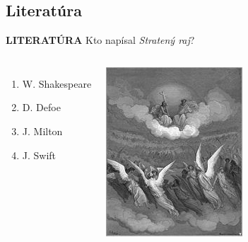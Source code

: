 \documentclass[dvipsnames]{beamer}
\begin{document}
\begin{frame}
	\subsection{Literatúra}
	\textbf{LITERATÚRA}
	\vskip 3mm
	Kto  napísal \textit{Stratený raj}?
	\begin{columns}
		\begin{enumerate}
			\item W. Shakespeare
			\item D. Defoe
			\item J. Milton
			\item J. Swift
		\end{enumerate}
		\includegraphics[scale=0.75]{lost}

	\end{columns}
\end{frame}
\end{document}

